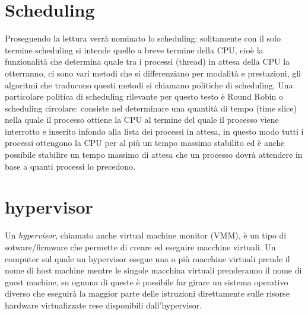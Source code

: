 \section{Scheduling}
Proseguendo la lettura verrà nominato lo scheduling: solitamente con il solo termine scheduling si intende quello a breve termine della CPU, cioè la funzionalità che determina quale tra i processi (thread) in attesa della CPU la otterranno, ci sono vari metodi che si differenziano per modalità e prestazioni, gli algoritmi che traducono questi metodi si chiamano politiche di scheduling.
Una particolare politica di scheduling rilevante per questo testo è Round Robin o scheduling circolare: consiste nel determinare una quantità di tempo (time slice) nella quale il processo ottiene la CPU al termine del quale il processo viene interrotto e inserito infondo alla lista dei processi in attesa, in questo modo tutti i processi ottengono la CPU per al più un tempo massimo stabilito ed è anche possibile stabilire un tempo massimo di attesa che un processo dovrà attendere in base a quanti processi lo precedono.

\section{hypervisor}
Un \textit{hypervisor}, chiamato anche virtual machine monitor (VMM), è un tipo di sotware/firmware che permette di creare ed eseguire macchine virtuali. Un computer sul quale un hypervisor esegue una o più macchine virtuali prende il nome di host machine mentre le singole macchina virtuali prenderanno il nome di guest machine, su ognuna di queste è possibile far girare un sistema operativo diverso che eseguirà la maggior parte delle istruzioni direttamente sulle risorse hardware virtualizzate rese disponibili dall'hypervisor.